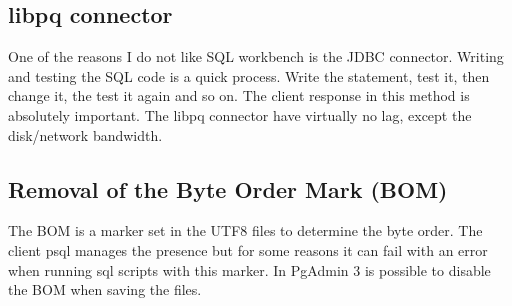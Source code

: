 \subsection{libpq connector}
One of the reasons I do not like SQL workbench is the JDBC connector. Writing and testing the SQL code is a quick
process. Write the statement, test it, then change it, the test it again and so on. The client response in this 
method is absolutely important. The libpq connector have virtually no lag, except the disk/network bandwidth.

\subsection{Removal of the Byte Order Mark (BOM)} 
The BOM is a marker set in the UTF8 files to determine the byte order. The client psql manages the presence but 
for some reasons it can fail with an error when running sql scripts with this marker. In PgAdmin 3 is 
possible to disable the BOM when saving the files.



